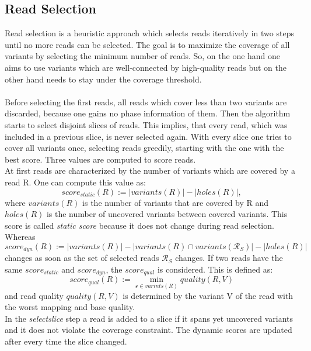 \subsection{Read Selection}
\label{Read Selection}
Read selection is a heuristic approach which selects reads iteratively in two steps until no more reads can be selected. The goal is to maximize the coverage of all variants by selecting the minimum number of reads. So, on the one hand one aims to use variants which are well-connected by high-quality reads but on the other hand needs to stay under the coverage threshold. \cite{Readselection}\\
\\
Before selecting the first reads, all reads which cover less than two variants are discarded, because one gains no phase information of them. Then the algorithm starts to select disjoint slices of reads. This implies, that every read, which was included in a previous slice, is never selected again. With every slice one tries to cover all variants once, selecting reads greedily, starting with the one with the best score. Three values are computed to score reads. \cite{Readselection}\\
At first reads are characterized by the number of variants which are covered by a read R. One can compute this value as:
\begin{equation*}
 score_{static}(R):=|variants(R)|-|holes(R)|,
\end{equation*} 
 where \( variants(R) \) is the number of variants that are covered by R and \( holes(R) \) is the number of uncovered variants between covered variants. This score is called \textit{static score} because it does not change during read selection. Whereas
\begin{equation*}
score_{dyn}(R):=|variants(R)|-|variants(R)\cap variants(\mathcal{R}_{S})|-|holes(R)|
\end{equation*}
 changes as soon as the set of selected reads \( \mathcal{R}_{S} \) changes. If two reads have the same \( score_{static} \) and \( score_{dyn} \), the \( score_{qual} \) is considered. This is defined as: 
\begin{equation*}
 score_{qual}(R):= \min_{\mathcal{v} \in varints(R)}quality(R,V) 
 \end{equation*}
  and read quality \( quality(R,V) \) is determined by the variant V of the read with the worst mapping and base quality. \cite{Readselection}\\
In the \textit{selectslice} step a read is added to a slice if it spans yet uncovered variants and it does not violate the coverage constraint. The dynamic scores are updated after every time the slice changed. \cite{Readselection}\\
